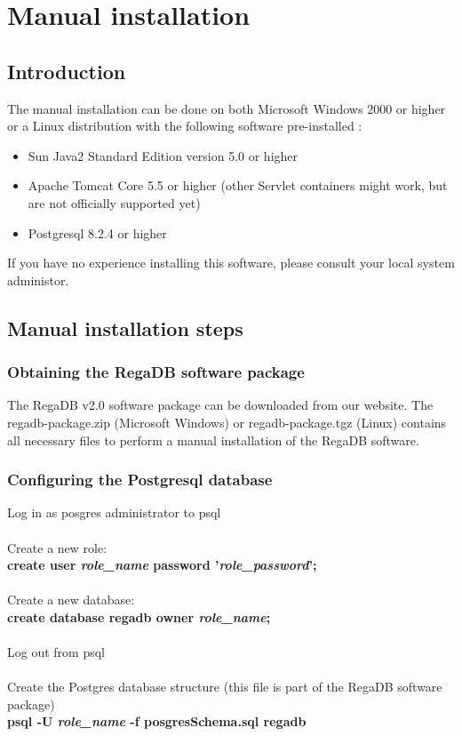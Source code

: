 \chapter{Manual installation}
\label{chapter:manual_install}

\section{Introduction}
The manual installation can be done on both Microsoft Windows 2000 or higher or a Linux distribution with the following software pre-installed : 
\begin{itemize}
\item Sun Java2 Standard Edition version 5.0 or higher
\item Apache Tomcat Core 5.5 or higher (other Servlet containers might work, but are not officially supported yet)
\item Postgresql 8.2.4 or higher
\end{itemize}
If you have no experience installing this software, please consult your local system administor.

\section{Manual installation steps}
\subsection{Obtaining the RegaDB software package}
The RegaDB v2.0 software package can be downloaded from our website. The regadb-package.zip (Microsoft Windows) or regadb-package.tgz (Linux) contains all necessary files to perform a manual installation of the RegaDB software.

\subsection{Configuring the Postgresql database}
Log in as posgres administrator to psql
\\
\\
Create a new role:
\\
\textbf{create user \textit{role\_name} password '\textit{role\_password}';}
\\
\\
Create a new database:
\\
\textbf{create database regadb owner \textit{role\_name};}
\\
\\
Log out from psql
\\
\\
Create the Postgres database structure (this file is part of the RegaDB software package)
\\
\textbf{psql -U \textit{role\_name} -f posgresSchema.sql regadb}

